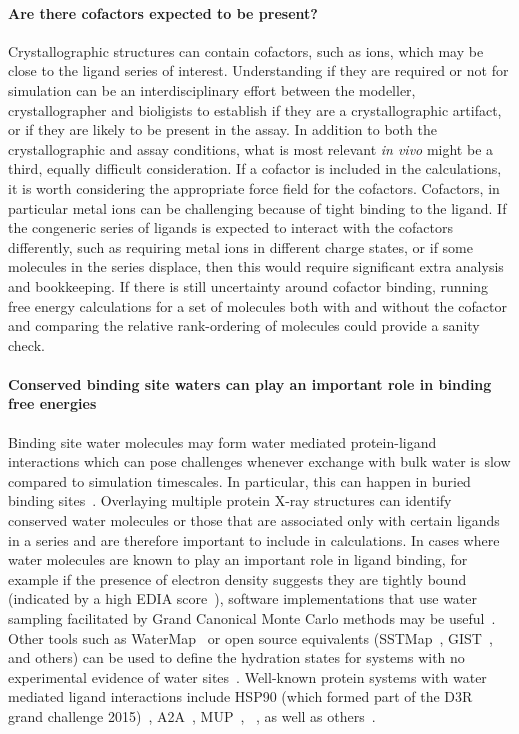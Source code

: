 \documentclass[9pt,bestpractices]{livecoms}
\begin{document}
\paragraph{Are there cofactors expected to be present?}
Crystallographic structures can contain cofactors, such as ions, which may be close to the ligand series of interest. Understanding if they are required or not for simulation can be an interdisciplinary effort between the modeller, crystallographer and bioligists to establish if they are a crystallographic artifact, or if they are likely to be present in the assay. In addition to both the crystallographic and assay conditions, what is most relevant \textit{in vivo} might be a third, equally difficult consideration. If a cofactor is included in the calculations, it is worth considering the appropriate force field for the cofactors. Cofactors, in particular metal ions can be challenging\cite{mobley2017predicting, guven2024protocols} because of tight binding to the ligand.  If the congeneric series of ligands is expected to interact with the cofactors differently, such as requiring metal ions in different charge states, or if some molecules in the series displace, then this would require significant extra analysis and bookkeeping. If there is still uncertainty around cofactor binding, running free energy calculations for a set of molecules both with and without the cofactor and comparing the relative rank-ordering of molecules could provide a sanity check.
 

\paragraph{Conserved binding site waters can play an important role in binding free energies}
Binding site water molecules may form water mediated protein-ligand interactions which can pose challenges whenever exchange with bulk water is slow compared to simulation timescales. In particular, this can happen in buried binding sites~\cite{laage2017water}. Overlaying multiple protein X-ray structures can identify conserved water molecules or those that are associated only with certain ligands in a series and are therefore important to include in calculations. In cases where water molecules are known to play an important role in ligand binding, for example if the presence of electron density suggests they are tightly bound (indicated by a high EDIA score~\cite{nittinger2015evidence,meyder2017estimating}), software implementations that use water sampling facilitated by Grand Canonical Monte Carlo methods may be useful~\cite{michel2010prediction}. Other tools such as WaterMap~\cite{abel2008role,young2007motifs} or open source equivalents (SSTMap~\cite{haider2018solvation}, GIST~\cite{ramsey2016solvation}, and others) can be used to define the hydration states for systems with no experimental evidence of water sites~\cite{wang2011ligand}. Well-known protein systems with water mediated ligand interactions include HSP90 (which formed part of the D3R grand challenge 2015)~\cite{mey2016blinded}, A2A~\cite{brucemacdonald2018ligand}, MUP~\cite{ross2015water}, ~\cite{deflorian2020accurate}, as well as others~\cite{michel2009energetics}.
\end{document}
